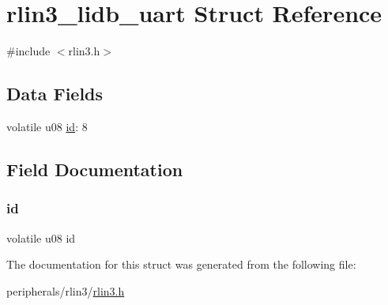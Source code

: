 \hypertarget{structrlin3__lidb__uart}{}\section{rlin3\+\_\+lidb\+\_\+uart Struct Reference}
\label{structrlin3__lidb__uart}


{\ttfamily \#include $<$rlin3.\+h$>$}

\subsection*{Data Fields}
\begin{DoxyCompactItemize}
\item 
volatile u08 \mbox{\hyperlink{structrlin3__lidb__uart_a3ae97311ba580a35b3502f9f36f303ee}{id}}\+: 8
\end{DoxyCompactItemize}


\subsection{Field Documentation}
\mbox{\label{structrlin3__lidb__uart_a3ae97311ba580a35b3502f9f36f303ee}} 
\subsubsection{\texorpdfstring{id}{id}}
{\footnotesize\ttfamily volatile u08 id}



The documentation for this struct was generated from the following file\+:\begin{DoxyCompactItemize}
\item 
peripherals/rlin3/\mbox{\hyperlink{rlin3_8h}{rlin3.\+h}}\end{DoxyCompactItemize}
